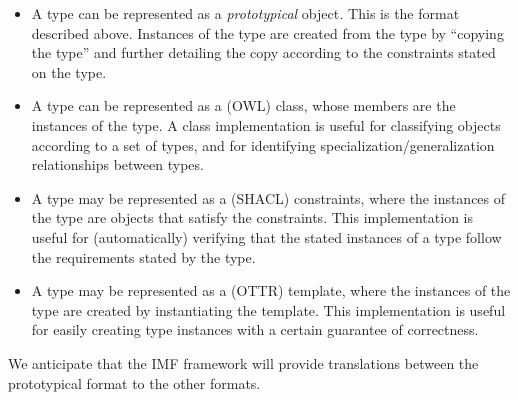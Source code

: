 \begin{itemize}
  \item A type can be represented as a \emph{prototypical }object\emph{. }This is the format described above.
        Instances of the type are created from the type by ``copying the type'' and further detailing the copy according to
        the constraints stated on the type.
  \item A type can be represented as a (OWL) class, whose members are the instances of the type. A class implementation
        is useful for classifying objects according to a set of types, and for identifying specialization/generalization
        relationships between types.
  \item A type may be represented as a (SHACL) constraints, where the instances of the type are objects that satisfy the
        constraints. This implementation is useful for (automatically) verifying that the stated instances of a type follow
        the requirements stated by the type.
  \item A type may be represented as a (OTTR) template, where the instances of the type are created by instantiating the
        template. This implementation is useful for easily creating type instances with a certain guarantee of correctness.
\end{itemize}
We anticipate that the IMF framework will provide translations between the prototypical format to the other formats.